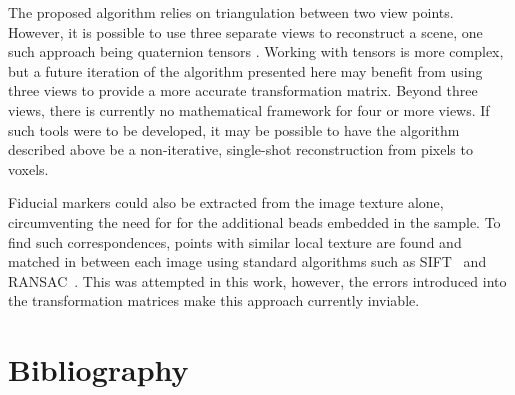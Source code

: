 \documentclass[times, twoside, watermark]{zHenriquesLab-StyleBioRxiv}
\begin{document}
The proposed algorithm relies on triangulation between two view points.
However, it is possible to use three separate views %
to reconstruct a scene, one such approach being quaternion tensors \cite{hartleyMultipleViewGeometry}.
Working with tensors is more complex, but a future iteration of the algorithm presented here may benefit from using three views to provide a more accurate transformation matrix.
Beyond three views, there is currently no mathematical framework for four or more views.
If such tools were to be developed, it may be possible to have the algorithm described above be a non-iterative, single-shot reconstruction from pixels to voxels.

Fiducial markers could also be extracted from the image texture alone, circumventing the need for for the additional beads embedded in the sample.
To find such correspondences, points with similar local texture are found and matched in between each image using standard algorithms such as SIFT~\cite{loweObjectRecognitionLocal1999} and RANSAC~\cite{fischlerRandomSampleConsensus1981}. %
This was attempted in this work, however, the errors introduced into the transformation matrices make this approach currently inviable.

\begin{acknowledgements}
\end{acknowledgements}

\section*{Bibliography}

\onecolumn
\newpage
%
\end{document}
